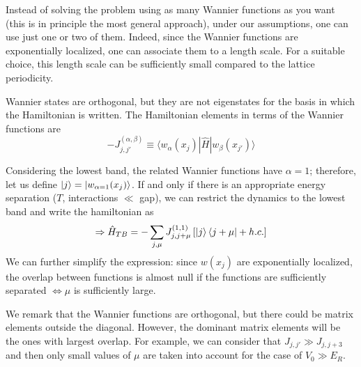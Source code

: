 Instead of solving the problem using as many Wannier functions as you want (this is in principle the most general approach), under our assumptions, one can use just one or two of them. Indeed, since the Wannier functions are exponentially localized, one can associate them to a length scale. For a suitable choice, this length scale can be sufficiently small compared to the lattice periodicity.

Wannier states are orthogonal, but they are not eigenstates for the basis in which the Hamiltonian is written. The Hamiltonian elements in terms of the Wannier functions are
$$ - J_{j,j'}^{(\alpha,\beta)} \equiv \langle w_\alpha(x_j)|\hat{H}|w_\beta(x_{j'}) \rangle$$







\noindent Considering the lowest band, the related Wannier functions have $\alpha = 1$; therefore, let us define $\ket{j} = \ket{w_{\alpha=1}(x_j)}$. If and only if there is an appropriate energy separation ($T$, interactions $\ll$ gap), we can restrict the dynamics to the lowest band and write the hamiltonian as
\begin{equation}
\label{eq:tight-band-all}
    \Rightarrow \hat{H}_{TB} = -\sum_{j,\mu} J_{j,j+\mu}^{(1,1)} \left[ \ket{j}\bra{j+\mu} + h.c. \right]
\end{equation}
%
We can further simplify the expression: since $w(x_j)$ are exponentially localized, the overlap between functions is almost null if the functions are sufficiently separated $\Leftrightarrow \mu$ is sufficiently large.

\begin{center}
    \scalebox{1.4}{  }
\end{center}

We remark that the Wannier functions are orthogonal, but there could be matrix elements outside the diagonal.
However, the dominant matrix elements will be the ones with largest overlap. For example, we can consider that $J_{j,j'} \gg J_{j,j+3}$ and then only small values of $\mu$ are taken into account for the case of $V_0 \gg E_R$.\\

